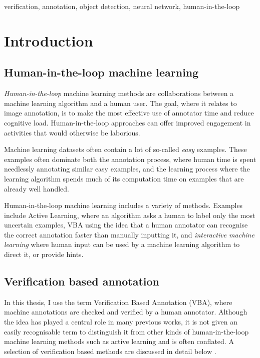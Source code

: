 \documentclass[conference]{IEEEtran}
\begin{document}
\begin{IEEEkeywords}
verification, annotation, object detection, neural network, human-in-the-loop
\end{IEEEkeywords}

\section{Introduction}


\subsection{Human-in-the-loop machine learning}

\emph{Human-in-the-loop} machine learning methods are collaborations between a machine learning algorithm and a human user. The goal, where it relates to image annotation, is to make the most effective use of annotator time and reduce cognitive load. Human-in-the-loop approaches can offer improved engagement in activities that would otherwise be laborious.

Machine learning datasets often contain a lot of so-called \emph{easy} examples. These examples often dominate both the annotation process, where human time is spent needlessly annotating similar easy examples, and the learning process where the learning algorithm spends much of its computation time on examples that are already well handled. 

Human-in-the-loop machine learning includes a variety of methods. Examples include Active Learning, where an algorithm asks a human to label only the most uncertain examples, \gls{VBA} using the idea that a human annotator can recognise the correct annotation faster than manually inputting it, and \emph{interactive machine learning} where human input can be used by a machine learning algorithm to direct it, or provide hints. 

\subsection{Verification based annotation}

In this thesis, I use the term Verification Based Annotation (VBA), where machine annotations are checked and verified by a human annotator. Although the idea has played a central role in many previous works, it is not given an easily recognisable term to distinguish it from other kinds of human-in-the-loop machine learning methods such as active learning and is often conflated. A selection of verification based methods are discussed in detail below \cite{Yao2012, McNeill2011, Adhikaria2018, Castrejon2017, Papadopoulos2016, Russakovsky2015a}. 
\end{document}
